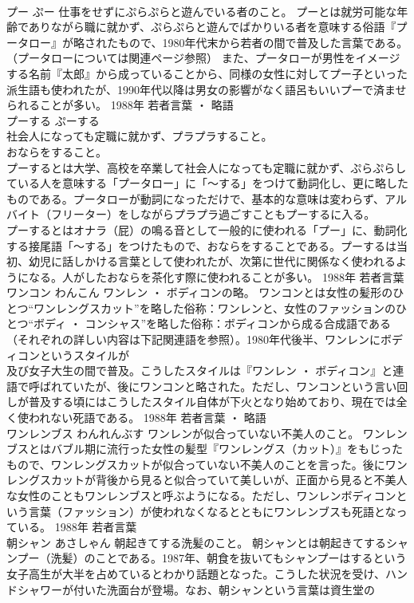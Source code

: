\documentclass[8pt]{extreport}
\begin{document}
\begin{CJK}{UTF8}{min}
\\	プー	ぷー	仕事をせずにぷらぷらと遊んでいる者のこと。	プーとは就労可能な年齢でありながら職に就かず、ぷらぷらと遊んでばかりいる者を意味する俗語『プータロー』が略されたもので、1980年代末から若者の間で普及した言葉である。（プータローについては関連ページ参照） また、プータローが男性をイメージする名前『太郎』から成っていることから、同様の女性に対してプー子といった派生語も使われたが、1990年代以降は男女の影響がなく語呂もいいプーで済ませられることが多い。	1988年	若者言葉 ・ 略語	
\\	プーする	ぷーする	
\\	社会人になっても定職に就かず、プラプラすること。 
\\	おならをすること。	
\\	プーするとは大学、高校を卒業して社会人になっても定職に就かず、ぷらぷらしている人を意味する「プータロー」に「～する」をつけて動詞化し、更に略したものである。プータローが動詞になっただけで、基本的な意味は変わらず、アルバイト（フリーター）をしながらプラプラ過ごすこともプーするに入る。 
\\	プーするとはオナラ（屁）の鳴る音として一般的に使われる「プー」に、動詞化する接尾語「～する」をつけたもので、おならをすることである。プーするは当初、幼児に話しかける言葉として使われたが、次第に世代に関係なく使われるようになる。人がしたおならを茶化す際に使われることが多い。	1988年	若者言葉	
\\	ワンコン	わんこん	ワンレン ・ ボディコンの略。	ワンコンとは女性の髪形のひとつ“ワンレングスカット”を略した俗称：ワンレンと、女性のファッションのひとつ“ボディ ・ コンシャス”を略した俗称：ボディコンから成る合成語である（それぞれの詳しい内容は下記関連語を参照）。1980年代後半、ワンレンにボディコンというスタイルが
\\	及び女子大生の間で普及。こうしたスタイルは『ワンレン ・ ボディコン』と連語で呼ばれていたが、後にワンコンと略された。ただし、ワンコンという言い回しが普及する頃にはこうしたスタイル自体が下火となり始めており、現在では全く使われない死語である。	1988年	若者言葉 ・ 略語	
\\	ワンレンブス	わんれんぶす	ワンレンが似合っていない不美人のこと。	ワンレンブスとはバブル期に流行った女性の髪型『ワンレングス（カット）』をもじったもので、ワンレングスカットが似合っていない不美人のことを言った。後にワンレングスカットが背後から見ると似合っていて美しいが、正面から見ると不美人な女性のこともワンレンブスと呼ぶようになる。ただし、ワンレンボディコンという言葉（ファッション）が使われなくなるとともにワンレンブスも死語となっている。	1988年	若者言葉	
\\	朝シャン	あさしゃん	朝起きてする洗髪のこと。	朝シャンとは朝起きてするシャンプー（洗髪）のことである。1987年、朝食を抜いてもシャンプーはするという女子高生が大半を占めているとわかり話題となった。こうした状況を受け、ハンドシャワーが付いた洗面台が登場。なお、朝シャンという言葉は資生堂の

\end{CJK}
\end{document}

